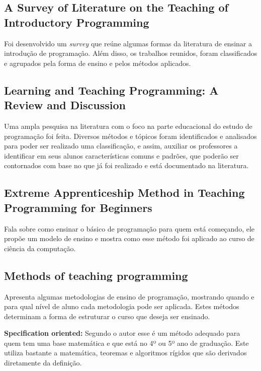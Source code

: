 \subsection{A Survey of Literature on the Teaching of Introductory Programming} \nocite{Pears:2007:SLT:1345443.1345441}
 Foi desenvolvido um \textit{survey} que reúne algumas formas da literatura de ensinar a introdução de programação. Além disso, os trabalhos reunidos, foram classificados e agrupados pela forma de ensino e pelos métodos aplicados.

\subsection{Learning and Teaching Programming: A Review	and Discussion} \nocite{doi:10.1076/csed.13.2.137.14200} 
Uma ampla pesquisa na literatura com o foco na parte educacional do estudo de programação foi feita. Diversos métodos e tópicos foram identificados e analisados para poder ser realizado uma classificação, e assim, auxiliar os professores a identificar em seus alunos características comuns e padrões, que poderão ser contornados com base no que já foi realizado e está documentado na literatura.

\subsection{Extreme Apprenticeship Method in Teaching Programming for Beginners} \nocite{Vihavainen:2011:EAM:1953163.1953196}
\label{subsec:vihavainen}
Fala sobre como ensinar o básico de programação para quem está começando, ele propõe um modelo de ensino e mostra como esse método foi aplicado ao curso de ciência da computação.

\subsection{Methods of teaching programming} 
\nocite{methods}
\label{subsec:methods}
 Apresenta algumas metodologias de ensino de programação, mostrando quando e para qual nível de aluno cada metodologia pode ser aplicada. Estes métodos determinam a forma de estruturar o curso que deseja ser ensinado. 

	\textbf{Specification oriented:} Segundo o autor esse é um método adequado para quem tem uma base matemática e que está no 4º ou 5º ano de graduação. Este utiliza bastante a matemática, teoremas e algoritmos rígidos que são derivados diretamente da definição. 


 



